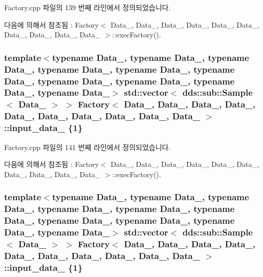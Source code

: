Factory.\+cpp 파일의 139 번째 라인에서 정의되었습니다.



다음에 의해서 참조됨 \+:  Factory$<$ Data\+\_, Data\+\_, Data\+\_, Data\+\_, Data\+\_, Data\+\_, Data\+\_, Data\+\_, Data\+\_, Data\+\_ $>$\+::exec\+Factory().

\subsubsection[{\texorpdfstring{input\+\_\+data\+\_\+2}{input_data_2}}]{\setlength{\rightskip}{0pt plus 5cm}template$<$typename Data\+\_, typename Data\+\_, typename Data\+\_, typename Data\+\_, typename Data\+\_, typename Data\+\_, typename Data\+\_, typename Data\+\_, typename Data\+\_, typename Data\+\_$>$ std\+::vector$<$ dds\+::sub\+::\+Sample$<$ Data\+\_ $>$ $>$ {\bf Factory}$<$ Data\+\_, Data\+\_, Data\+\_, Data\+\_, Data\+\_, Data\+\_, Data\+\_, Data\+\_, Data\+\_, Data\+\_ $>$\+::input\+\_\+data\+\_ \{1\}}\hypertarget{classFactory_af23053102c7edeb254b91930647ed3e7}{}\label{classFactory_af23053102c7edeb254b91930647ed3e7}


Factory.\+cpp 파일의 141 번째 라인에서 정의되었습니다.



다음에 의해서 참조됨 \+:  Factory$<$ Data\+\_, Data\+\_, Data\+\_, Data\+\_, Data\+\_, Data\+\_, Data\+\_, Data\+\_, Data\+\_, Data\+\_ $>$\+::exec\+Factory().

\subsubsection[{\texorpdfstring{input\+\_\+data\+\_\+3}{input_data_3}}]{\setlength{\rightskip}{0pt plus 5cm}template$<$typename Data\+\_, typename Data\+\_, typename Data\+\_, typename Data\+\_, typename Data\+\_, typename Data\+\_, typename Data\+\_, typename Data\+\_, typename Data\+\_, typename Data\+\_$>$ std\+::vector$<$ dds\+::sub\+::\+Sample$<$ Data\+\_ $>$ $>$ {\bf Factory}$<$ Data\+\_, Data\+\_, Data\+\_, Data\+\_, Data\+\_, Data\+\_, Data\+\_, Data\+\_, Data\+\_, Data\+\_ $>$\+::input\+\_\+data\+\_ \{1\}}\hypertarget{classFactory_af87769552e1c9b6b4f910eb992f23f9f}{}\label{classFactory_af87769552e1c9b6b4f910eb992f23f9f}


